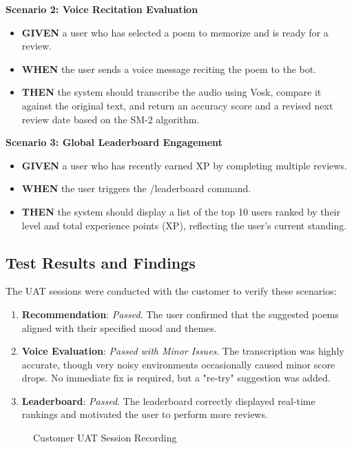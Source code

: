 \documentclass[12pt,a4paper]{article}
\begin{document}
\textbf{Scenario 2: Voice Recitation Evaluation}
\begin{itemize}
    \item \textbf{GIVEN} a user who has selected a poem to memorize and is ready for a review.
    \item \textbf{WHEN} the user sends a voice message reciting the poem to the bot.
    \item \textbf{THEN} the system should transcribe the audio using Vosk, compare it against the original text, and return an accuracy score and a revised next review date based on the SM-2 algorithm.
\end{itemize}

\textbf{Scenario 3: Global Leaderboard Engagement}
\begin{itemize}
    \item \textbf{GIVEN} a user who has recently earned XP by completing multiple reviews.
    \item \textbf{WHEN} the user triggers the /leaderboard command.
    \item \textbf{THEN} the system should display a list of the top 10 users ranked by their level and total experience points (XP), reflecting the user's current standing.
\end{itemize}

\subsection{Test Results and Findings}
The UAT sessions were conducted with the customer to verify these scenarios:
\begin{enumerate}
    \item \textbf{Recommendation}: \textit{Passed}. The user confirmed that the suggested poems aligned with their specified mood and themes.
    \item \textbf{Voice Evaluation}: \textit{Passed with Minor Issues}. The transcription was highly accurate, though very noisy environments occasionally caused minor score drops. No immediate fix is required, but a "re-try" suggestion was added.
    \item \textbf{Leaderboard}: \textit{Passed}. The leaderboard correctly displayed real-time rankings and motivated the user to perform more reviews.
\end{enumerate}

\begin{figure}[h]
    \centering
    \caption{Customer UAT Session Recording}
    \label{fig:uat_video}
\end{figure}
\end{document}
